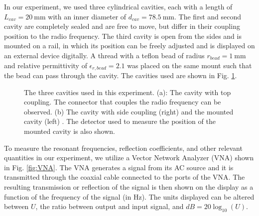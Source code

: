 \documentclass[a4paper]{article}
\numberwithin{equation}{section}
\begin{document}
In our experiment, we used three cylindrical cavities, each with a length of
$L_{cav} = \SI{20}{\milli\metre}$ with an inner diameter of $d_{cav} =
\SI{78.5}{\milli\metre}$. The first and second cavity are completely sealed and
are free to move, but differ in their coupling position to the radio frequency.
The third cavity is open from the sides and is mounted on a rail, in which its
position can be freely adjusted and is displayed on an external device
digitally. A thread with a teflon bead of radius $r_{bead} = \SI{1}{\milli\metre}$ and
relative permittivity of $\epsilon_{r, bead} = 2.1$ was placed on the same
mount such that the bead can pass through the cavity. The cavities used are shown in Fig.
\ref{fig:cavities_equipment}.

\begin{figure}[hbt!]
	\centering
	\quad

	\caption{The three cavities used in this experiment. (a): The cavity with
	top coupling. The connector that couples the radio frequency can be
	observed. (b) The cavity with side coupling (right) and the mounted cavity
	(left) \cite*{Switka22}. The detector used to measure the position of the
	mounted cavity is also shown.}
	\label{fig:cavities_equipment}
\end{figure}

To measure the resonant frequencies, reflection coefficients, and other relevant
quantities in our experiment, we utilize a Vector Network Analyzer (VNA) shown
in Fig. \ref{fig:VNA}. The VNA generates a signal from its AC source and it is
transmitted through the coaxial cable connected to the ports of the VNA. The
resulting transmission or reflection of the signal is then shown on the display
as a function of the frequency of the signal (in Hz). The units displayed can be
altered between $U$, the ratio between output and input signal, and $dB = 20
\log_{10}(U)$. \par  
\end{document}
